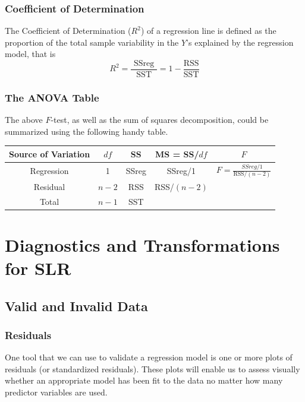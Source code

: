 \documentclass[10pt]{article}
\begin{document}
\subsubsection{Coefficient of Determination}
The Coefficient of Determination ($R^2$) of a regression line is defined as the proportion of the total sample variability in the $Y$'s explained by the regression model, that is
\begin{equation*}
    R^{2}=\frac{\text { SSreg }}{\mathrm{SST}}=1-\frac{\mathrm{RSS}}{\mathrm{SST}}
\end{equation*}

\subsubsection{The ANOVA Table}
The above $F$-test, as well as the sum of squares decomposition, could be summarized using the following handy table. 
\begin{center}
    \begin{tabular}{|c||c|c|c|c|}
        \hline
        Source of Variation & $df$    & SS    & MS = SS/$df$& $F$                                      \\ \hline \hline
        Regression          & 1     & SSreg & SSreg/1     & $F = \frac{SSreg/1}{\text{RSS}/(n-2)}$ \\ \hline
        Residual            & $n-2$ & RSS   & RSS/$(n-2)$ &                                        \\ \hline
        Total               & $n-1$ & SST   &             &                                        \\ \hline
    \end{tabular}
\end{center}


\section{Diagnostics and Transformations for SLR}
\subsection{Valid and Invalid Data}
\subsubsection{Residuals}
One tool that we can use to validate a regression model is one or more plots of residuals (or standardized residuals). These plots will enable us to assess visually whether an appropriate model has been fit to the data no matter how many predictor variables are used. 
\end{document}
